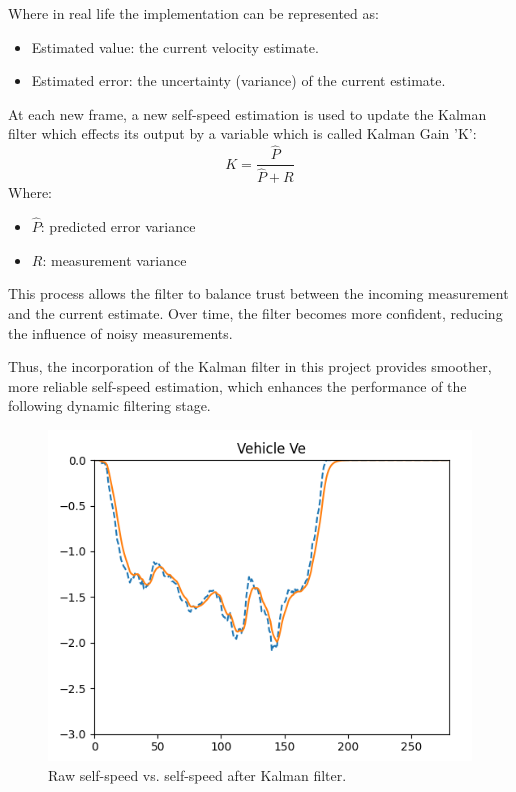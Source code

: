 Where in real life the implementation can be represented as:
\begin{itemize}
    \item Estimated value: the current velocity estimate.
    \item Estimated error: the uncertainty (variance) of the current estimate.
\end{itemize}
At each new frame, a new self-speed estimation is used to update the Kalman filter which effects its output by a variable which is called Kalman Gain 'K':
\begin{equation}
K = \frac{\hat{P}}{\hat{P} + R}
\end{equation}
Where:
\begin{itemize}
    \item $\hat{P}$: predicted error variance
    \item $R$: measurement variance
\end{itemize}
This process allows the filter to balance trust between the incoming measurement and the current estimate. Over time, the filter becomes more confident, reducing the influence of noisy measurements.

Thus, the incorporation of the Kalman filter in this project provides smoother, more reliable self-speed estimation, which enhances the performance of the following dynamic filtering stage.

\begin{figure}[!htbp]
    \centering
    \includegraphics[width=1.0\linewidth]{images/kalman.png}
    \caption{Raw self-speed vs. self-speed after Kalman filter.}
    \label{fig: Test vehicle actual speed vs estimated speed.}
\end{figure}